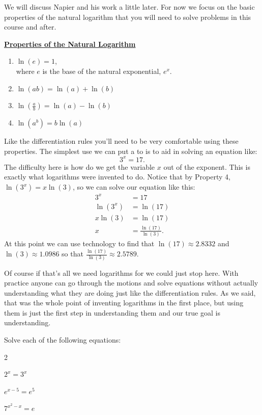 We will discuss Napier and his work a little later. For now we focus
on the basic properties of  the natural logarithm that you will need
to solve problems in this course and after.
\begin{center}
  \begin{minipage}[h]{.6\linewidth}
    \centerline{\bf{}\underline{Properties of the Natural Logarithm}}
    \begin{enumerate}
    \item $\ln(e)=1$,\\ where $e$ is the base of the natural exponential,
      $e^x$.      
    \item $\ln(ab)=\ln(a)+\ln(b)$
    \item $\ln\left(\frac{a}{b}\right)=\ln(a)-\ln(b)$
    \item $\ln\left(a^b\right)=b\ln(a)$
    \end{enumerate}
  \end{minipage}
\end{center}
Like the differentiation rules you'll need to be very comfortable
using these properties.  The simplest use we can put a  to is to aid in  solving an equation like:
$$
3^x=17.
$$
The difficulty here is how do we get the variable $x$ out of the
exponent. This is exactly what logarithms were invented to do. Notice
that by Property 4, $\ln(3^x)=x\ln(3)$, so we can solve our equation
like this:
\begin{align*}
  3^x&=17\\
  \ln(3^x)&=\ln(17)\\
  x\ln(3)&= \ln(17)\\
  x&=\frac{\ln(17)}{\ln(3)}.
\end{align*}
At this point we can use technology to find that
$\ln(17) \approx 2.8332$ and $\ln(3)\approx1.0986$ so that
$\frac{\ln(17)}{\ln(3)}\approx2.5789$.

Of course if that's all we need logarithms for we could just stop
here. With practice anyone can go through the motions and solve
equations without actually understanding what they are doing just like
the differentiation rules. As we said, that was the whole point of
inventing logarithms in the first place, but using them is just the
first step in understanding them and our true goal is understanding.  

\begin{ProficiencyDrillSection}
  \begin{ProficiencyDrill}
    Solve each of the following equations:
    \begin{enumerate}[label={\bf{}(\alph*)}]
      \begin{multicols}{2}
      \item $2^{x}=3^x$
      \item $e^{x-5}=e^5$
      \item $7^{x^2-x}=e$
      \end{multicols}
    \end{enumerate}
  \end{ProficiencyDrill}
\end{ProficiencyDrillSection}

